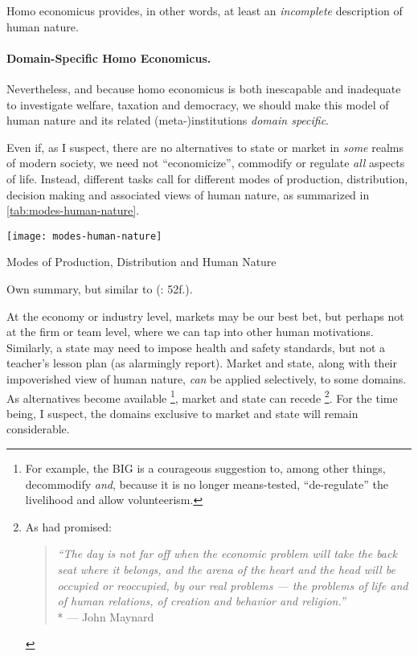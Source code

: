 {Homo economicus provides, in other words, at least an \emph{incomplete} description of human nature.

\paragraph{Domain-Specific Homo Economicus.}
Nevertheless, and because homo economicus is both inescapable and inadequate to investigate welfare, taxation and democracy, we should make this model of human nature and its related (meta-)institutions \emph{domain specific}.

Even if, as I suspect, there are no alternatives to state or market in \emph{some} realms of modern society, we need not ``economicize'', commodify or regulate \emph{all} aspects of life.
Instead, different tasks call for different modes of production, distribution, decision making and associated views of human nature, as summarized in \autoref{tab:modes-human-nature}.

\begin{table}[htbp]
	\centering
	\texttt{[image: modes-human-nature]}
	\caption{Modes of Production, Distribution and Human Nature}
	\label{tab:modes-human-nature}
	\scriptsize{Own summary, but similar to \citeauthor{Schmitter1985} (\citeyear{Schmitter1985}: 52f.).}
\end{table}%

At the economy or industry level, markets may be our best bet, but perhaps not at the firm or team level, where we can tap into other human motivations.
Similarly, a state may need to impose health and safety standards, but not a teacher's lesson plan (as \citeauthor{Schwartz2010} alarmingly report).
Market and state, along with their impoverished view of human nature, \emph{can} be applied selectively, to some domains.
As alternatives become available
\footnote{
	For example, the \gls{BIG} is a courageous suggestion to, among other things, decommodify \emph{and}, because it is no longer means-tested, ``de-regulate'' the livelihood \citep[for example,][]{Offe2009} and allow volunteerism.
},
market and state can recede
\footnote{
	As \citeauthor{Keynes} had promised:
	\begin{quote}
		\emph{``The day is not far off when the economic problem will take the back seat where it belongs, and the arena of the heart and the head will be occupied or reoccupied, by our real problems --- the problems of life and of human relations, of creation and behavior and religion.''}\\*
		--- John Maynard \cite{Keynes}%
	\end{quote}
}.
For the time being, I suspect, the domains exclusive to market and state will remain considerable.

}
